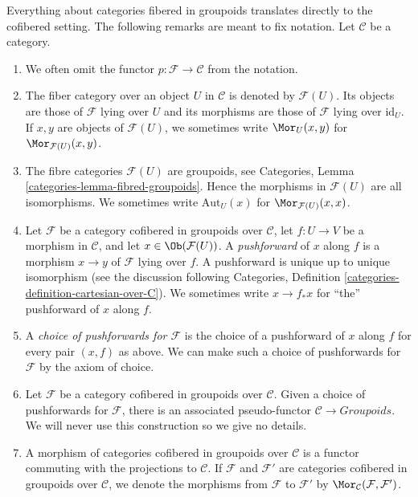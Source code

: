 \begin{remarks}
\label{remarks-cofibered-groupoids}
Everything about categories fibered in groupoids translates directly to the
cofibered setting. The following remarks are meant to fix notation.
Let $\mathcal{C}$ be a category.
\begin{enumerate}
\item We often omit the functor $p: \mathcal{F} \to \mathcal{C}$ from the
notation.
\item The fiber category over an object $U$ in $\mathcal{C}$ is denoted by
$\mathcal{F}(U)$. Its objects are those of $\mathcal{F}$ lying over $U$ and its
morphisms are those of $\mathcal{F}$ lying over $\text{id}_U$.
If $x, y$  are objects of $\mathcal{F}(U)$, we sometimes write
$\Mor_U(x, y)$ for $\Mor_{\mathcal{F}(U)}(x, y)$.
\item The fibre categories $\mathcal{F}(U)$ are groupoids, see
Categories, Lemma \ref{categories-lemma-fibred-groupoids}.
Hence the morphisms in $\mathcal{F}(U)$ are all isomorphisms.
We sometimes write $\text{Aut}_U(x)$ for $\Mor_{\mathcal{F}(U)}(x, x)$.
\item
\label{item-pushforward}
Let $\mathcal{F}$ be a category cofibered in groupoids over
$\mathcal{C}$, let $f: U \to V$ be a morphism in $\mathcal{C}$, and
let $x \in \Ob(\mathcal{F}(U))$.
A {\it pushforward} of $x$ along $f$ is a morphism
$x \to y$ of $\mathcal{F}$ lying over $f$. A pushforward
is unique up to unique isomorphism (see the discussion following
Categories, Definition \ref{categories-definition-cartesian-over-C}).
We sometimes write $x \to f_*x$ for ``the'' pushforward of $x$
along $f$.
\item A {\it choice of pushforwards for $\mathcal{F}$} is the choice of
a pushforward of $x$ along $f$ for every pair $(x, f)$ as above. We can make
such a choice of pushforwards for $\mathcal{F}$ by the axiom of choice.
\item Let $\mathcal{F}$ be a category cofibered in groupoids over
$\mathcal{C}$. Given a choice of pushforwards for $\mathcal{F}$, there
is an associated pseudo-functor $\mathcal{C} \to \textit{Groupoids}$.
We will never use this construction so we give no details.
\item
\label{item-cofibered-morphism}
A morphism of categories cofibered in groupoids over $\mathcal{C}$ is a
functor commuting with the projections to $\mathcal{C}$. If $\mathcal{F}$
and $\mathcal{F}'$ are categories cofibered in groupoids over
$\mathcal{C}$, we denote the morphisms from $\mathcal{F}$ to $\mathcal{F}'$
by $\Mor_\mathcal{C}(\mathcal{F}, \mathcal{F}')$.

\end{enumerate}
\end{remarks}
